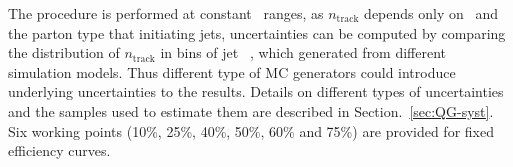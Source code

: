 The procedure is performed at constant \pt\ ranges, as $n_\mathrm{track}$ depends only on \pt\ and the parton type that initiating jets, uncertainties can be computed by comparing the distribution of $n_\mathrm{track}$ in bins of jet \pt~, which generated from different simulation models. Thus different type of MC generators could introduce underlying uncertainties to the results. Details on different types of uncertainties and the samples used to estimate them are described in Section.~\ref{sec:QG-syst}. Six working points (10\%, 25\%, 40\%, 50\%, 60\% and 75\%) are provided for fixed efficiency curves.


%
%
%
